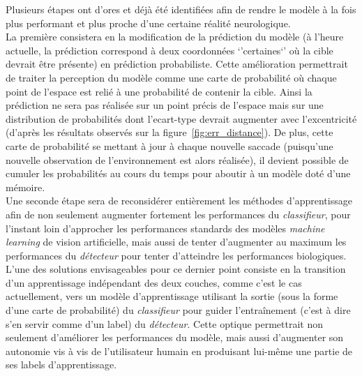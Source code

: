 Plusieurs étapes ont d'ores et déjà été identifiées afin de rendre le modèle à la fois plus performant et plus proche d'une certaine réalité neurologique. \\
La première consistera en la modification de la prédiction du modèle (à l'heure actuelle, la prédiction correspond à deux coordonnées `'certaines`' où la cible devrait être présente) en prédiction probabiliste. 
Cette amélioration permettrait de traiter la perception du modèle comme une carte de probabilité où chaque point de l'espace est relié à une probabilité de contenir la cible. Ainsi la prédiction ne sera pas réalisée sur un point précis de l'espace mais sur une distribution de probabilités dont l'ecart-type devrait augmenter avec l'excentricité (d'après les résultats observés sur la figure~\ref{fig:err_distance}). De plus, cette carte de probabilité se mettant à jour à chaque nouvelle saccade (puisqu'une nouvelle observation de l'environnement est alors réalisée), il devient possible de cumuler les probabilités au cours du temps pour aboutir à un modèle doté d'une mémoire. \autocite{Butko2010, Najemnik2005} \\

Une seconde étape sera de reconsidérer entièrement les méthodes d'apprentissage afin de non seulement augmenter fortement les performances du \textit{classifieur}, pour l'instant loin d'approcher les performances standards des modèles \textit{machine learning} de vision artificielle, mais aussi de tenter d'augmenter au maximum les performances du \textit{détecteur} pour tenter d'atteindre les performances biologiques. \\
L'une des solutions envisageables pour ce dernier point consiste en la transition d'un apprentissage indépendant des deux couches, comme c'est le cas actuellement, vers un modèle d'apprentissage utilisant la sortie (sous la forme d'une carte de probabilité) du \textit{classifieur} pour guider l'entraînement (c'est à dire s'en servir comme d'un label) du \textit{détecteur}. Cette optique permettrait non seulement d'améliorer les performances du modèle, mais aussi d'augmenter son autonomie vis à vis de l'utilisateur humain en produisant lui-même une partie de ses labels d'apprentissage. \\

